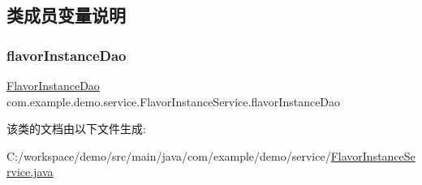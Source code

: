 \subsection{类成员变量说明}
\mbox{\label{classcom_1_1example_1_1demo_1_1service_1_1_flavor_instance_service_a70439a9226d7e127c86fd37ecff26b22}} 
\subsubsection{\texorpdfstring{flavor\+Instance\+Dao}{flavorInstanceDao}}
{\footnotesize\ttfamily \mbox{\hyperlink{interfacecom_1_1example_1_1demo_1_1dao_1_1_flavor_instance_dao}{Flavor\+Instance\+Dao}} com.\+example.\+demo.\+service.\+Flavor\+Instance\+Service.\+flavor\+Instance\+Dao\hspace{0.3cm}{\ttfamily [private]}}



该类的文档由以下文件生成\+:\begin{DoxyCompactItemize}
\item 
C\+:/workspace/demo/src/main/java/com/example/demo/service/\mbox{\hyperlink{_flavor_instance_service_8java}{Flavor\+Instance\+Service.\+java}}\end{DoxyCompactItemize}
